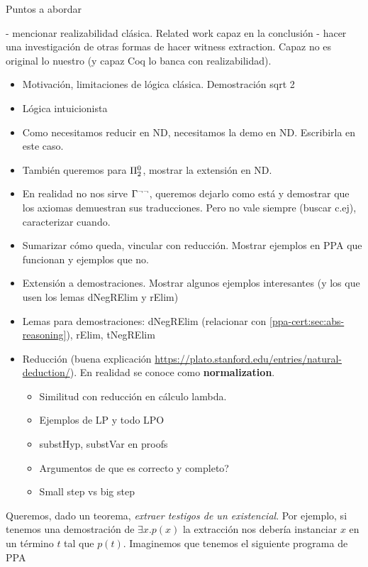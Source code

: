 Puntos a abordar

- mencionar realizabilidad clásica. Related work capaz en la conclusión
- hacer una investigación de otras formas de hacer witness extraction. Capaz no es original lo nuestro (y capaz Coq lo banca con realizabilidad).

\begin{itemize}
    \item Motivación, limitaciones de lógica clásica. Demostración sqrt 2
    \item Lógica intuicionista
    \item Como necesitamos reducir en ND, necesitamos la demo en ND. Escribirla
    en este caso.
    \item También queremos para $\Pi^0_2$, mostrar la extensión en ND.
    \item En realidad no nos sirve $\Gamma^{\neg\neg}$, queremos dejarlo como
    está y demostrar que los axiomas demuestran sus traducciones. Pero no vale
    siempre (buscar c.ej), caracterizar cuando.
    \item Sumarizar cómo queda, vincular con reducción. Mostrar ejemplos en PPA
    que funcionan y ejemplos que no.
    \item Extensión a demostraciones. Mostrar algunos ejemplos interesantes (y
    los que usen los lemas dNegRElim y rElim)
    \item Lemas para demostraciones: dNegRElim (relacionar con \ref{ppa-cert:sec:abs-reasoning}), rElim, tNegRElim
    \item Reducción (buena explicación
    \url{https://plato.stanford.edu/entries/natural-deduction/}). En realidad se
    conoce como \textbf{normalization}.
    \begin{itemize}
        \item Similitud con reducción en cálculo lambda.
        \item Ejemplos de LP y todo LPO
        \item substHyp, substVar en proofs
        \item Argumentos de que es correcto y completo?
        \item Small step vs big step
    \end{itemize}
\end{itemize}

Queremos, dado un teorema, \textit{extraer testigos de un existencial}. Por
ejemplo, si tenemos una demostración de $\exists x . p(x)$ la extracción nos
debería instanciar $x$ en un término $t$ tal que $p(t)$. Imaginemos que tenemos
el siguiente programa de PPA

